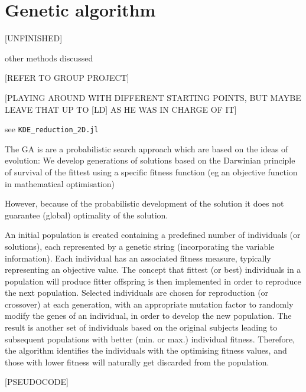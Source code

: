 \documentclass[journal, a4paper]{IEEEtran}
\begin{document}
\section{Genetic algorithm}
[UNFINISHED]

other methods discussed

[REFER TO GROUP PROJECT]

[PLAYING AROUND WITH DIFFERENT STARTING POINTS, BUT MAYBE LEAVE THAT UP TO [LD] AS HE WAS IN CHARGE OF IT]

see \texttt{KDE\_reduction\_2D.jl}


The GA is are a probabilistic search approach which are based on the ideas of evolution: We develop generations of solutions based on the Darwinian principle of survival of the fittest using a specific fitness function (eg an objective function in mathematical optimisation)

However, because of the probabilistic development of the solution it does not guarantee (global) optimality of the solution. 

An initial population is created containing a predefined number of individuals (or solutions), each represented by a genetic string (incorporating the variable information). Each individual has an associated fitness measure, typically representing an objective value. The concept that fittest (or best) individuals in a population will produce fitter offspring is then implemented in order to reproduce the next population. Selected individuals are chosen for reproduction (or crossover) at each generation, with an appropriate mutation factor to randomly modify the genes of an individual, in order to develop the new population. The result is another set of individuals based on the original subjects leading to subsequent populations with better (min. or max.) individual fitness. Therefore, the algorithm identifies the individuals with the optimising fitness values, and those with lower fitness will naturally get discarded from the population.



[PSEUDOCODE]

\end{document}

